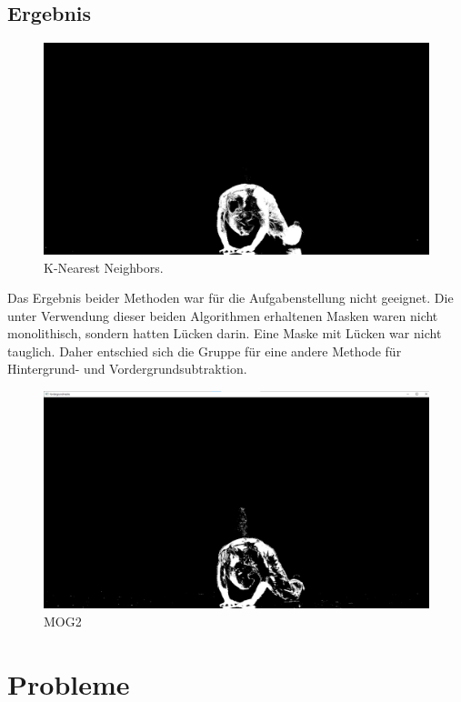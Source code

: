 \documentclass[12pt]{scrartcl}
\begin{document}
\subsection{Ergebnis}
\begin{figure}
  \includegraphics[width=\linewidth]{knn.png}
  \caption{K-Nearest Neighbors.}
  \label{fig:knn}
\end{figure}
Das Ergebnis beider Methoden war f\"ur die Aufgabenstellung nicht geeignet. Die unter Verwendung dieser beiden Algorithmen erhaltenen Masken waren nicht monolithisch, sondern hatten L\"ucken darin. Eine Maske mit L\"ucken war nicht tauglich.
Daher entschied sich die Gruppe f\"ur eine andere Methode f\"ur Hintergrund- und Vordergrundsubtraktion.\\
\begin{figure}
  \includegraphics[width=\linewidth]{mog2.png}
  \caption{MOG2}
  \label{fig:mog2}
\end{figure}


\section{Probleme}
\end{document}
